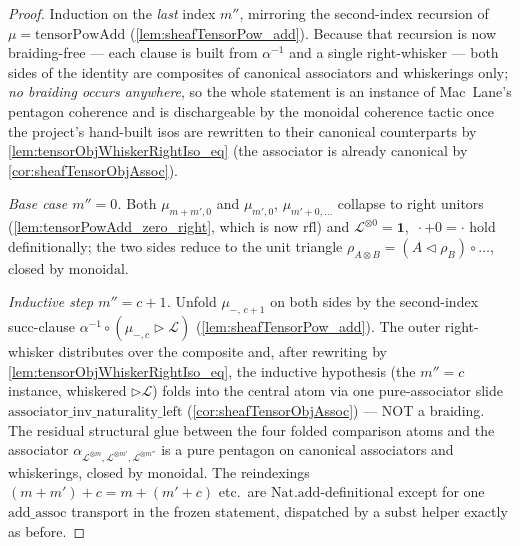 \begin{proof}
  Induction on the \emph{last} index \(m''\), mirroring the second-index recursion
  of \(\mu = \mathrm{tensorPowAdd}\) (\cref{lem:sheafTensorPow_add}). Because that
  recursion is now braiding-free --- each clause is built from \(\alpha^{-1}\) and a
  single right-whisker --- both sides of the identity are composites of canonical
  associators and whiskerings only; \emph{no braiding occurs anywhere}, so the whole
  statement is an instance of Mac~Lane's pentagon coherence and is dischargeable by
  the \(\mathrm{monoidal}\) coherence tactic once the project's hand-built isos are
  rewritten to their canonical counterparts by \cref{lem:tensorObjWhiskerRightIso_eq}
  (the associator is already canonical by \cref{cor:sheafTensorObjAssoc}).

  \emph{Base case \(m'' = 0\).} Both \(\mu_{m+m',0}\) and \(\mu_{m',0}\),
  \(\mu_{m'+0,\dots}\) collapse to right unitors (\cref{lem:tensorPowAdd_zero_right},
  which is now \(\mathrm{rfl}\)) and \(\mathcal{L}^{\otimes 0} = \mathbf{1}\), \(\,\cdot
  + 0 = \cdot\) hold definitionally; the two sides reduce to the unit triangle
  \(\rho_{A\otimes B} = (A \lhd \rho_B)\circ\dots\), closed by \(\mathrm{monoidal}\).

  \emph{Inductive step \(m'' = c+1\).} Unfold \(\mu_{-,\,c+1}\) on both sides by the
  second-index succ-clause \(\alpha^{-1}\circ(\mu_{-,c}\rhd\mathcal{L})\)
  (\cref{lem:sheafTensorPow_add}). The outer right-whisker distributes over the
  composite and, after rewriting by \cref{lem:tensorObjWhiskerRightIso_eq}, the
  inductive hypothesis (the \(m''=c\) instance, whiskered \(\rhd\mathcal{L}\)) folds
  into the central atom via one pure-associator slide
  \(\mathrm{associator\_inv\_naturality\_left}\) (\cref{cor:sheafTensorObjAssoc}) ---
  NOT a braiding. The residual structural glue between the four folded comparison
  atoms and the associator \(\alpha_{\mathcal{L}^{\otimes m},\mathcal{L}^{\otimes
  m'},\mathcal{L}^{\otimes m''}}\) is a pure pentagon on canonical associators and
  whiskerings, closed by \(\mathrm{monoidal}\). The reindexings \((m+m')+c =
  m+(m'+c)\) etc.\ are \(\mathrm{Nat.add}\)-definitional except for one
  \(\mathrm{add\_assoc}\) transport in the frozen statement, dispatched by a
  \(\mathrm{subst}\) helper exactly as before.
\end{proof}

